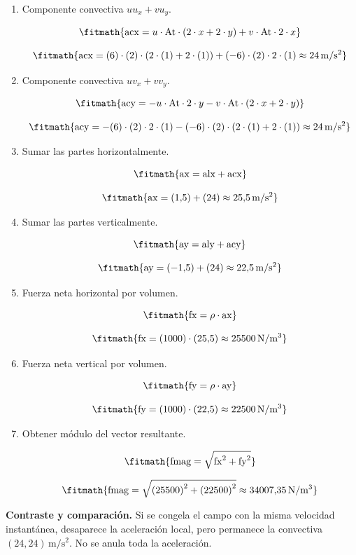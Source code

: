 \begin{enumerate}
\item Componente convectiva $uu_x+vu_y$.

\[\fitmath{\mathrm{acx}=u\cdot \mathrm{At}\cdot \left(2\cdot x+2\cdot y\right)+v\cdot \mathrm{At}\cdot 2\cdot x}\]

\[\fitmath{\mathrm{acx}=(6)\cdot (2)\cdot \left(2\cdot (1)+2\cdot (1)\right)+(-6)\cdot (2)\cdot 2\cdot (1)\approx 24\,\mathrm{m/s^{2}}}\]

\item Componente convectiva $uv_x+vv_y$.

\[\fitmath{\mathrm{acy}=-u\cdot \mathrm{At}\cdot 2\cdot y-v\cdot \mathrm{At}\cdot \left(2\cdot x+2\cdot y\right)}\]

\[\fitmath{\mathrm{acy}=-(6)\cdot (2)\cdot 2\cdot (1)-(-6)\cdot (2)\cdot \left(2\cdot (1)+2\cdot (1)\right)\approx 24\,\mathrm{m/s^{2}}}\]

\item Sumar las partes horizontalmente.

\[\fitmath{\mathrm{ax}=\mathrm{alx}+\mathrm{acx}}\]

\[\fitmath{\mathrm{ax}=(1{,}5)+(24)\approx 25{,}5\,\mathrm{m/s^{2}}}\]

\item Sumar las partes verticalmente.

\[\fitmath{\mathrm{ay}=\mathrm{aly}+\mathrm{acy}}\]

\[\fitmath{\mathrm{ay}=(-1{,}5)+(24)\approx 22{,}5\,\mathrm{m/s^{2}}}\]

\item Fuerza neta horizontal por volumen.

\[\fitmath{\mathrm{fx}=\rho\cdot \mathrm{ax}}\]

\[\fitmath{\mathrm{fx}=(1000)\cdot (25{,}5)\approx 25500\,\mathrm{N/m^{3}}}\]

\item Fuerza neta vertical por volumen.

\[\fitmath{\mathrm{fy}=\rho\cdot \mathrm{ay}}\]

\[\fitmath{\mathrm{fy}=(1000)\cdot (22{,}5)\approx 22500\,\mathrm{N/m^{3}}}\]

\item Obtener módulo del vector resultante.

\[\fitmath{\mathrm{fmag}=\sqrt{{\mathrm{fx}}^{2}+{\mathrm{fy}}^{2}}}\]

\[\fitmath{\mathrm{fmag}=\sqrt{{(25500)}^{2}+{(22500)}^{2}}\approx 34007{,}35\,\mathrm{N/m^{3}}}\]

\end{enumerate}

\noindent\textbf{Contraste y comparación.} Si se congela el campo con la misma velocidad instantánea, desaparece la aceleración local, pero permanece la convectiva $(24,24)\,\mathrm{m/s^2}$. No se anula toda la aceleración.
